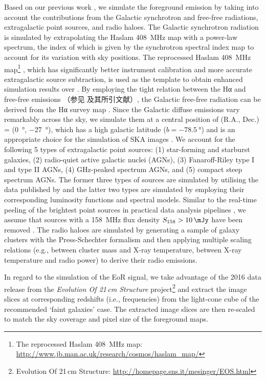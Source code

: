 Based on our previous work \cite{wang2010}, we simulate the foreground
emission by taking into account the contributions from the Galactic
synchrotron and free-free radiations, extragalactic point sources, and
radio haloes.
The Galactic synchrotron radiation is simulated by extrapolating the Haslam
\SI{408}{\MHz} map with a power-law spectrum, the index of which is given
by the synchrotron spectral index map \cite{giardino2002} to account for
its variation with sky positions.
The reprocessed Haslam \SI{408}{\MHz} map\footnote{%
  The reprocessed Haslam \SI{408}{\MHz} map:
  \url{http://www.jb.man.ac.uk/research/cosmos/haslam_map/}}
\cite{remazeilles2015}, which has significantly better instrument
calibration and more accurate extragalactic source subtraction,
is used as the template to obtain enhanced simulation results over
\citet{wang2010}.
By employing the tight relation between the Hα and free-free
emissions （参见  及其所引文献）,
the Galactic free-free radiation can be derived from the Hα survey map
\cite{finkbeiner2003}.
Since the Galactic diffuse emissions vary remarkably across the sky, we
simulate them at a central position of (R.A., Dec.\@) = (\SI{0}{\degree},
\SI{-27}{\degree}), which has a high galactic latitude
($b = \SI{-78.5}{\degree}$) and is an appropriate choice for the simulation
of SKA images \cite{beardsley2016}.
We account for the following 5 types of extragalactic point sources:
(1) star-forming and starburst galaxies, (2) radio-quiet active galactic
nuclei (AGNs), (3) Fanaroff-Riley type I and type II AGNs, (4) GHz-peaked
spectrum AGNs, and (5) compact steep spectrum AGNs.
The former three types of sources are simulated by utilising the data
published by \citet{wilman2008} and the latter two types are simulated by
employing their corresponding luminosity functions and spectral models.
Similar to the real-time peeling of the brightest point sources in
practical data analysis pipelines \cite{mitchell2008,intema2009},
we assume that sources with a \SI{158}{\MHz} flux density
$S_{158} > \SI{10}{\mJy}$ have been removed \cite{liu2009ps}.
The radio haloes are simulated by generating a sample of galaxy clusters
with the Press-Schechter formalism \cite{press1974} and then applying
multiple scaling relations (e.g., between cluster mass and X-ray
temperature, between X-ray temperature and radio power) to derive their
radio emissions.

In regard to the simulation of the EoR signal, we take advantage of the
2016 data release from the
\textit{Evolution Of 21\,cm Structure} project\footnote{%
  Evolution Of 21\,cm Structure:
  \url{http://homepage.sns.it/mesinger/EOS.html}}
\cite{mesinger2016} and extract the image slices at corresponding
redshifts (i.e., frequencies) from the light-cone cube of the recommended
`faint galaxies' case.
The extracted image slices are then re-scaled to match the sky coverage and
pixel size of the foreground maps.

